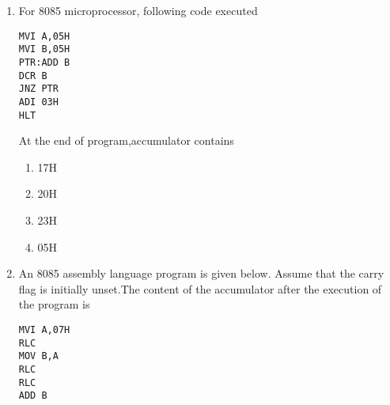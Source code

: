 \documentclass[journal,12pt,twocolumn]{IEEEtran}
\begin{document}
\begin{enumerate}
\item For 8085 microprocessor, following code executed
\begin{verbatim}
MVI A,05H
MVI B,05H
PTR:ADD B
DCR B
JNZ PTR
ADI 03H
HLT
\end{verbatim}
At the end of program,accumulator contains
     \begin{enumerate}
      \item 17H 
      \item 20H
      \item 23H
      \item 05H
    \end{enumerate}
    \item An 8085 assembly language program is given below. Assume that the carry flag is initially unset.The content of the accumulator after the execution of the program is
\begin{verbatim}
MVI A,07H
RLC
MOV B,A
RLC
RLC
ADD B
\end{verbatim}


\end{enumerate}
\end{document}
